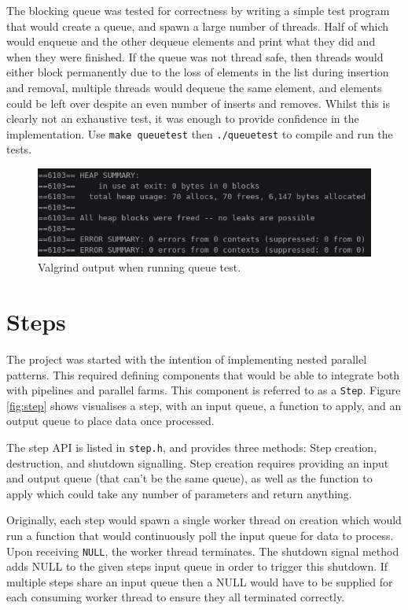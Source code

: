 \documentclass[12pt]{article}
\def\code#1{\texttt{#1}}
\begin{document}
The blocking queue was tested for correctness by writing a simple test program that would create a queue, and spawn a large number of threads. Half of which would enqueue and the other dequeue elements and print what they did and when they were finished. If the queue was not thread safe, then threads would either block permanently due to the loss of elements in the list during insertion and removal, multiple threads would dequeue the same element, and elements could be left over despite an even number of inserts and removes. Whilst this is clearly not an exhaustive test, it was enough to provide confidence in the implementation. Use \code{make queuetest} then \code{./queuetest} to compile and run the tests.

\begin{figure}[!ht]
	\centering 
	\includegraphics[width=\linewidth]{images/queuegrind}
	\caption{Valgrind output when running queue test.}
	\label{fig:queuegrind}
\end{figure}

\section{Steps}

The project was started with the intention of implementing nested parallel patterns. This required defining components that would be able to integrate both with pipelines and parallel farms. This component is referred to as a \code{Step}. Figure \ref{fig:step} shows visualises a step, with an input queue, a function to apply, and an output queue to place data once processed.

The step API is listed in \code{step.h}, and provides three methods: Step creation, destruction, and shutdown signalling. Step creation requires providing an input and output queue (that can't be the same queue), as well as the function to apply which could take any number of parameters and return anything. 

Originally, each step would spawn a single worker thread on creation which would run a function that would continuously poll the input queue for data to process. Upon receiving \code{NULL}, the worker thread terminates. The shutdown signal method adds NULL to the given steps input queue in order to trigger this shutdown. If multiple steps share an input queue then a NULL would have to be supplied for each consuming worker thread to ensure they all terminated correctly.
\end{document}
